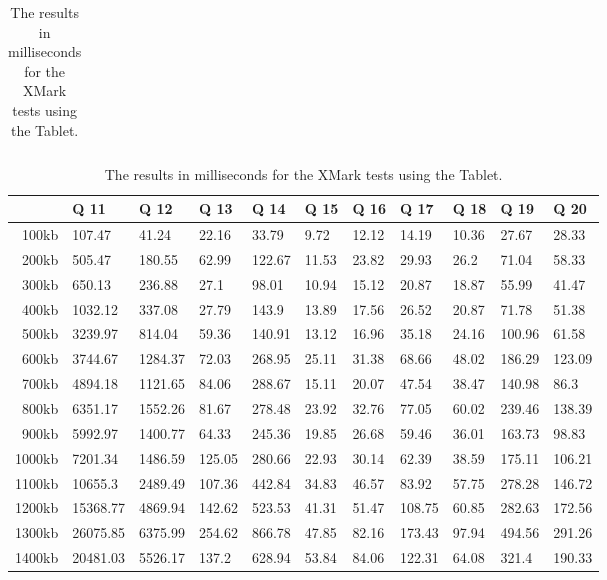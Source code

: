 \begin {table}[htpb]
\begin{tabular}{r|l|l|l|l|l|l|l|l|l|l}
\end{tabular}
\newline
\vspace*{0.5 cm}
\newline
\hspace*{-1.5cm}\begin{tabular}{r|l|l|l|l|l|l|l|l|l|l}
&Q 11&Q 12&Q 13&Q 14&Q 15&Q 16&Q 17&Q 18&Q 19&Q 20\\
\hline
100kb&107.47&41.24&22.16&33.79&9.72&12.12&14.19&10.36&27.67&28.33\\
200kb&505.47&180.55&62.99&122.67&11.53&23.82&29.93&26.2&71.04&58.33\\
300kb&650.13&236.88&27.1&98.01&10.94&15.12&20.87&18.87&55.99&41.47\\
400kb&1032.12&337.08&27.79&143.9&13.89&17.56&26.52&20.87&71.78&51.38\\
500kb&3239.97&814.04&59.36&140.91&13.12&16.96&35.18&24.16&100.96&61.58\\
600kb&3744.67&1284.37&72.03&268.95&25.11&31.38&68.66&48.02&186.29&123.09\\
700kb&4894.18&1121.65&84.06&288.67&15.11&20.07&47.54&38.47&140.98&86.3\\
800kb&6351.17&1552.26&81.67&278.48&23.92&32.76&77.05&60.02&239.46&138.39\\
900kb&5992.97&1400.77&64.33&245.36&19.85&26.68&59.46&36.01&163.73&98.83\\
1000kb&7201.34&1486.59&125.05&280.66&22.93&30.14&62.39&38.59&175.11&106.21\\
1100kb&10655.3&2489.49&107.36&442.84&34.83&46.57&83.92&57.75&278.28&146.72\\
1200kb&15368.77&4869.94&142.62&523.53&41.31&51.47&108.75&60.85&282.63&172.56\\
1300kb&26075.85&6375.99&254.62&866.78&47.85&82.16&173.43&97.94&494.56&291.26\\
1400kb&20481.03&5526.17&137.2&628.94&53.84&84.06&122.31&64.08&321.4&190.33\\
 \end{tabular}
\caption{The results in milliseconds for the XMark tests using the Tablet.}
\label{tab:xmark-tablet}
\end {table}
